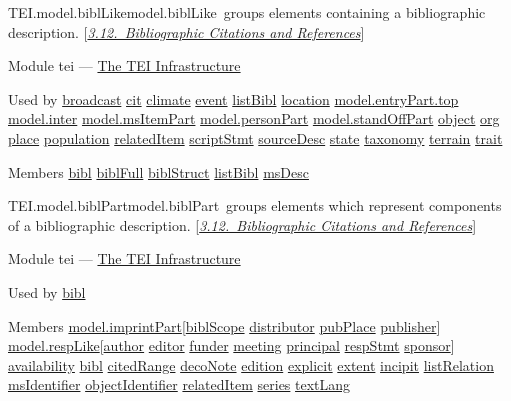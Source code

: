 \begin{reflist}
\item[]\begin{specHead}{TEI.model.biblLike}{model.biblLike} groups elements containing a bibliographic description. [\textit{\hyperref[COBI]{3.12.\ Bibliographic Citations and References}}]\end{specHead} 
    \item[{Module}]
  tei — \hyperref[ST]{The TEI Infrastructure}
    \item[{Used by}]
  \hyperref[TEI.broadcast]{broadcast} \hyperref[TEI.cit]{cit} \hyperref[TEI.climate]{climate} \hyperref[TEI.event]{event} \hyperref[TEI.listBibl]{listBibl} \hyperref[TEI.location]{location} \hyperref[TEI.model.entryPart.top]{model.entryPart.top} \hyperref[TEI.model.inter]{model.inter} \hyperref[TEI.model.msItemPart]{model.msItemPart} \hyperref[TEI.model.personPart]{model.personPart} \hyperref[TEI.model.standOffPart]{model.standOffPart} \hyperref[TEI.object]{object} \hyperref[TEI.org]{org} \hyperref[TEI.place]{place} \hyperref[TEI.population]{population} \hyperref[TEI.relatedItem]{relatedItem} \hyperref[TEI.scriptStmt]{scriptStmt} \hyperref[TEI.sourceDesc]{sourceDesc} \hyperref[TEI.state]{state} \hyperref[TEI.taxonomy]{taxonomy} \hyperref[TEI.terrain]{terrain} \hyperref[TEI.trait]{trait}
    \item[{Members}]
  \hyperref[TEI.bibl]{bibl} \hyperref[TEI.biblFull]{biblFull} \hyperref[TEI.biblStruct]{biblStruct} \hyperref[TEI.listBibl]{listBibl} \hyperref[TEI.msDesc]{msDesc}
\end{reflist}  
\begin{reflist}
\item[]\begin{specHead}{TEI.model.biblPart}{model.biblPart} groups elements which represent components of a bibliographic description. [\textit{\hyperref[COBI]{3.12.\ Bibliographic Citations and References}}]\end{specHead} 
    \item[{Module}]
  tei — \hyperref[ST]{The TEI Infrastructure}
    \item[{Used by}]
  \hyperref[TEI.bibl]{bibl}
    \item[{Members}]
  \hyperref[TEI.model.imprintPart]{model.imprintPart}[\hyperref[TEI.biblScope]{biblScope} \hyperref[TEI.distributor]{distributor} \hyperref[TEI.pubPlace]{pubPlace} \hyperref[TEI.publisher]{publisher}] \hyperref[TEI.model.respLike]{model.respLike}[\hyperref[TEI.author]{author} \hyperref[TEI.editor]{editor} \hyperref[TEI.funder]{funder} \hyperref[TEI.meeting]{meeting} \hyperref[TEI.principal]{principal} \hyperref[TEI.respStmt]{respStmt} \hyperref[TEI.sponsor]{sponsor}] \hyperref[TEI.availability]{availability} \hyperref[TEI.bibl]{bibl} \hyperref[TEI.citedRange]{citedRange} \hyperref[TEI.decoNote]{decoNote} \hyperref[TEI.edition]{edition} \hyperref[TEI.explicit]{explicit} \hyperref[TEI.extent]{extent} \hyperref[TEI.incipit]{incipit} \hyperref[TEI.listRelation]{listRelation} \hyperref[TEI.msIdentifier]{msIdentifier} \hyperref[TEI.objectIdentifier]{objectIdentifier} \hyperref[TEI.relatedItem]{relatedItem} \hyperref[TEI.series]{series} \hyperref[TEI.textLang]{textLang}
\end{reflist}  
